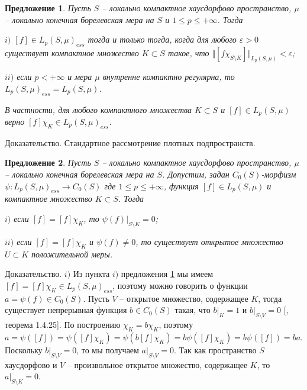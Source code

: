 \documentclass[12pt]{article}
\numberwithin{equation}{subsection}
\theoremstyle{plain}
\newtheorem{proposition}{Предложение}
\newenvironment{proof}{Доказательство.}{}
\begin{document}
\begin{fulltext}
    \begin{proposition}\label{LpEssC0ModCharac} Пусть $S$ -- локально компактное хаусдорфово пространст\-во, $\mu$ -- локально конечная борелевская мера на $S$ и $1\leq p\leq+\infty$. Тогда

        $i)$ $[f]\in L_p(S,\mu)_{ess}$ тогда и только тогда, когда для любого $\varepsilon >0$ существует компактное множество $K\subset S$ такое, что $\Vert [f\chi_{S\setminus K}]\Vert_{L_p(S,\mu)}< \varepsilon$;

        $ii)$ если $p<+\infty$ и мера $\mu$ внутренне компактно регулярна, то $L_p(S,\mu)_{ess}=L_p(S,\mu)$.

        В частности, для любого компактного множества $K\subset S$ и $[f]\in L_p(S,\mu)$ верно $[f]\chi_K\in L_p(S,\mu)_{ess}$.
    \end{proposition}
    \begin{proof} Стандартное рассмотрение плотных подпространств.
    \end{proof}


    \begin{proposition}\label{MorphLpEssC0Prop} Пусть $S$ -- локально компактное хаусдорфово пространст\-во, $\mu$ -- локально конечная борелевская мера на $S$. Допустим, задан $C_0(S)$-морфизм $\psi:L_p(S,\mu)_{ess}\to C_0(S)$ где $1\leq p\leq+\infty$, функция $[f]\in L_p(S,\mu)$ и компактное множество $K\subset S$. Тогда

        $i)$ если $[f]=[f]\chi_K$, то $\psi(f)|_{S\setminus K}=0$;

        $ii)$ если $[f]=[f]\chi_K$ и $\psi(f)\neq 0$, то существует открытое множество $U\subset K$ положительной меры.
    \end{proposition}
    \begin{proof} $i)$ Из пункта $i)$ предложения \ref{LpEssC0ModCharac} мы имеем $[f]=[f]\chi_K\in L_p(S,\mu)_{ess}$, поэтому можно говорить о функции $a=\psi(f)\in C_0(S)$. Пусть $V$ -- открытое множество, содержащее $K$, тогда существует непрерывная функция $b\in C_0(S)$ такая, что $b|_K=1$ и $b|_{S\setminus V}=0$ [\cite{DalesBanSpContFunDualSp}, теорема 1.4.25]. По построению $\chi_K=b\chi_K$, поэтому $a=\psi([f])=\psi([f]\chi_K)=\psi(b[f]\chi_K)=b\psi([f]\chi_K)=b\psi([f])=ba$. Поскольку $b|_{S\setminus V}=0$, то мы получаем $a|_{S\setminus V}=0$. Так как пространство $S$ хаусдорфово и $V$ -- произвольное открытое множество, содержащее $K$, то $a|_{S\setminus K}=0$.


\end{proof}
\end{fulltext}
\end{document}
